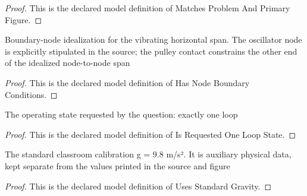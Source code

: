 \begin{proof}
  This is the declared model definition of Matches Problem And Primary Figure.
\end{proof}
\begin{definition}
  \label{def:physics:phyx-mini-0204:phyxminiproblems-problemphyxmini0204-hasnodeboundaryconditions}
  Boundary-node idealization for the vibrating horizontal span. The oscillator node is explicitly stipulated in the source; the pulley contact constrains the other end of the idealized node-to-node span
\end{definition}
\begin{proof}
  This is the declared model definition of Has Node Boundary Conditions.
\end{proof}
\begin{definition}
  \label{def:physics:phyx-mini-0204:phyxminiproblems-problemphyxmini0204-isrequestedoneloopstate}
  The operating state requested by the question: exactly one loop
\end{definition}
\begin{proof}
  This is the declared model definition of Is Requested One Loop State.
\end{proof}
\begin{definition}
  \label{def:physics:phyx-mini-0204:phyxminiproblems-problemphyxmini0204-usesstandardgravity}
  The standard classroom calibration g = 9.8 m/s². It is auxiliary physical data, kept separate from the values printed in the source and figure
\end{definition}
\begin{proof}
  This is the declared model definition of Uses Standard Gravity.
\end{proof}
